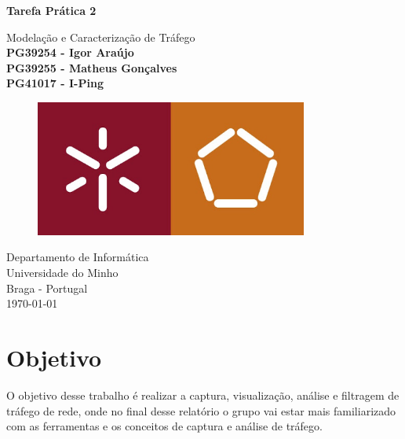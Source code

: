 \documentclass{llncs}
\begin{document}
\begin{titlepage}           
\end{titlepage}
\begin{titlepage}
  \begin{center}
    \vspace*{1cm}
    \Huge
    \textbf{Tarefa Prática 2}
    \vspace{0.5cm}
    
    \LARGE
    Modelação e Caracterização de Tráfego
    \vspace{1.0cm}
    \small
    \textbf{\\PG39254 - Igor Araújo\\PG39255 - Matheus Gonçalves\\PG41017 - I-Ping}
    
    \vspace{1.0cm}
    \begin{figure}[ht]
    \includegraphics[width=0.8\textwidth]{uminho.jpg}
    \centering
    \end{figure}
    
    \vspace{4.5cm}
    Departamento de Informática\\
    Universidade do Minho\\
    Braga - Portugal\\
    \today
          
  \end{center}
\end{titlepage}

\tableofcontents

\clearpage

\section{Objetivo}

%
O objetivo desse trabalho é realizar a captura, visualização, análise e filtragem de tráfego de rede, onde 
no final desse relatório o grupo vai estar mais familiarizado com as ferramentas e os conceitos de captura e análise de tráfego. 
\end{document}
